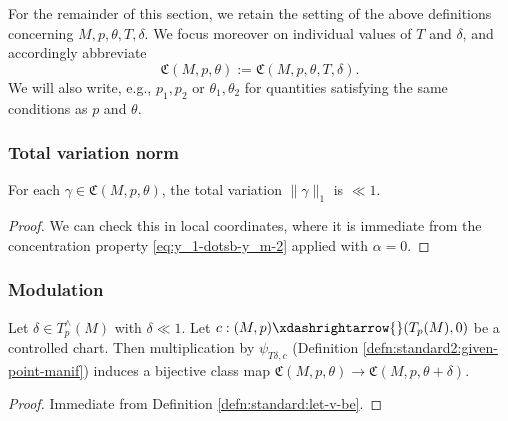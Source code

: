For the remainder of this section, we retain the setting of the above definitions concerning $M, p, \theta, T, \delta$.  We focus moreover on individual values of $T$ and $\delta$, and accordingly abbreviate
\begin{equation*}
  \mathfrak{C}(M,p,\theta) := \mathfrak{C}(M,p,\theta,T,\delta).
\end{equation*}
We will also write, e.g., $p_1, p_2$ or $\theta_1, \theta_2$ for quantities satisfying the same conditions as $p$ and $\theta$.


\subsubsection{Total variation norm}

\begin{lemma}\label{lem:standard:each-gamma-in}
  For each $\gamma \in \mathfrak{C}(M,p,\theta)$, the total variation $\|\gamma \|_1$ is $\ll 1$.
\end{lemma}
\begin{proof}
  We can check this in local coordinates, where it is immediate from the concentration property \eqref{eq:y_1-dotsb-y_m-2} applied with $\alpha =0$.
\end{proof}


\subsubsection{Modulation}\label{sec:modulation}

\begin{lemma}\label{lem:modulation}
  Let $\delta \in T_p^\wedge(M)$ with $\delta \ll 1$.  Let $c : (M,p) \xdashrightarrow{} (T_p(M), 0)$ be a controlled chart.  Then multiplication by $\psi_{T \delta,c}$ (Definition \ref{defn:standard2:given-point-manif}) induces a bijective class map $\mathfrak{C}(M,p,\theta) \rightarrow \mathfrak{C}(M,p,\theta+\delta)$.
\end{lemma}
\begin{proof}
  Immediate from Definition \ref{defn:standard:let-v-be}.
\end{proof}


